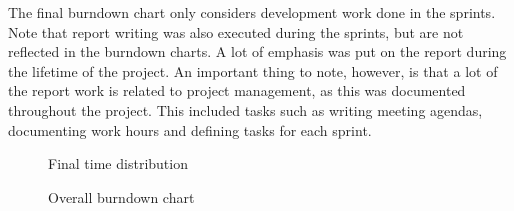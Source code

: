 The final burndown chart only considers development work done in the sprints. Note that report writing was also executed during the sprints, but are not reflected in the burndown charts. A lot of emphasis was put on the report during the lifetime of the project. An important thing to note, however, is that a lot of the report work is related to project management, as this was documented throughout the project. This included tasks such as writing meeting agendas, documenting work hours and defining tasks for each sprint.

\begin{center}
  \begin{figure}[h!]
    \caption{Final time distribution}
    \label{fig:kake2}
  \end{figure}
\end{center}

\begin{center}
  \begin{figure}[h!]
    \caption{Overall burndown chart}
    \label{fig:release-burndown}
  \end{figure}
\end{center}

